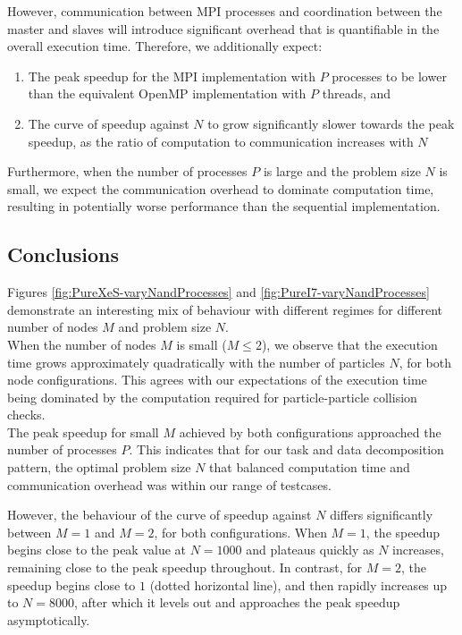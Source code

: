 \documentclass[12pt]{article}
\begin{document}
However, communication between MPI processes and coordination between the master and slaves will introduce significant overhead that is quantifiable in the overall execution time. Therefore, we additionally expect:
\begin{enumerate}[label=(\arabic*)]
\item The peak speedup for the MPI implementation with $P$ processes to be lower than the equivalent OpenMP implementation with $P$ threads, and 
\item The curve of speedup against $N$ to grow significantly slower towards the peak speedup, as the ratio of computation to communication increases with $N$
\end{enumerate}

Furthermore, when the number of processes $P$ is large and the problem size $N$ is small, we expect the communication overhead to dominate computation time, resulting in potentially worse performance than the sequential implementation.

\subsection{Conclusions}
\label{subsection:mpi-conclusions}

Figures \ref{fig:PureXeS-varyNandProcesses} and \ref{fig:PureI7-varyNandProcesses} demonstrate an interesting mix of behaviour with different regimes for different number of nodes $M$ and problem size $N$.\\

When the number of nodes $M$ is small ($M \leq 2$), we observe that the execution time grows approximately quadratically with the number of particles $N$, for both node configurations. This agrees with our expectations of the execution time being dominated by the computation required for particle-particle collision checks.\\

The peak speedup for small $M$ achieved by both configurations approached the number of processes $P$. This indicates that for our task and data decomposition pattern, the optimal problem size $N$ that balanced computation time and communication overhead was within our range of testcases.\\

\pagebreak

However, the behaviour of the curve of speedup against $N$ differs significantly between $M = 1$ and $M = 2$, for both configurations. When $M = 1$, the speedup begins close to the peak value at $N = 1000$ and plateaus quickly as $N$ increases, remaining close to the peak speedup throughout. In contrast, for $M = 2$, the speedup begins close to $1$ (dotted horizontal line), and then rapidly increases up to $N = 8000$, after which it levels out and approaches the peak speedup asymptotically.\\
\end{document}
